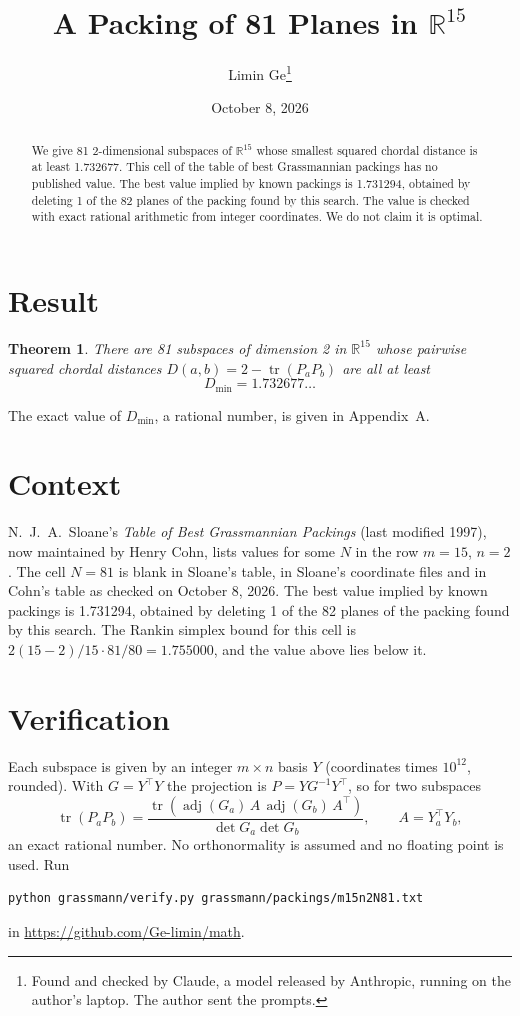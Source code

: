 \documentclass[11pt,a4paper]{article}
\title{A Packing of 81 Planes in $\mathbb{R}^{15}$}
\author{Limin Ge\thanks{Found and checked by Claude, a model released by Anthropic, running on the author's laptop. The author sent the prompts.}}
\date{October 8, 2026}
\newtheorem*{theorem}{Theorem}
\begin{document}
\maketitle
\begin{abstract}
We give 81 2-dimensional subspaces of $\mathbb{R}^{15}$ whose smallest squared chordal distance is at least 1.732677. This cell of the table of best Grassmannian packings has no published value. The best value implied by known packings is 1.731294, obtained by deleting 1 of the 82 planes of the packing found by this search. The value is checked with exact rational arithmetic from integer coordinates. We do not claim it is optimal.
\end{abstract}

\section{Result}
\begin{theorem}
There are 81 subspaces of dimension 2 in $\mathbb{R}^{15}$ whose pairwise squared chordal distances $D(a,b) = 2 - \operatorname{tr}(P_aP_b)$ are all at least
\[ D_{\min} = 1.732677\ldots \]
\end{theorem}
The exact value of $D_{\min}$, a rational number, is given in Appendix~A.


\section{Context}
N.~J.~A.~Sloane's \emph{Table of Best Grassmannian Packings} (last modified 1997), now maintained by Henry Cohn, lists values for some $N$ in the row $m=15$, $n=2$. The cell $N=81$ is blank in Sloane's table, in Sloane's coordinate files and in Cohn's table as checked on October 8, 2026. The best value implied by known packings is 1.731294, obtained by deleting 1 of the 82 planes of the packing found by this search. The Rankin simplex bound for this cell is $2(15-2)/15\cdot 81/80 = 1.755000$, and the value above lies below it.


\section{Verification}
Each subspace is given by an integer $m\times n$ basis $Y$ (coordinates times $10^{12}$, rounded). With $G=Y^\top Y$ the projection is $P=YG^{-1}Y^\top$, so for two subspaces
\[ \operatorname{tr}(P_aP_b)=\frac{\operatorname{tr}(\operatorname{adj}(G_a)\,A\,\operatorname{adj}(G_b)\,A^\top)}{\det G_a\det G_b},\qquad A=Y_a^\top Y_b, \]
an exact rational number. No orthonormality is assumed and no floating point is used. Run
\begin{verbatim}
python grassmann/verify.py grassmann/packings/m15n2N81.txt
\end{verbatim}
in \url{https://github.com/Ge-limin/math}.
\end{document}
